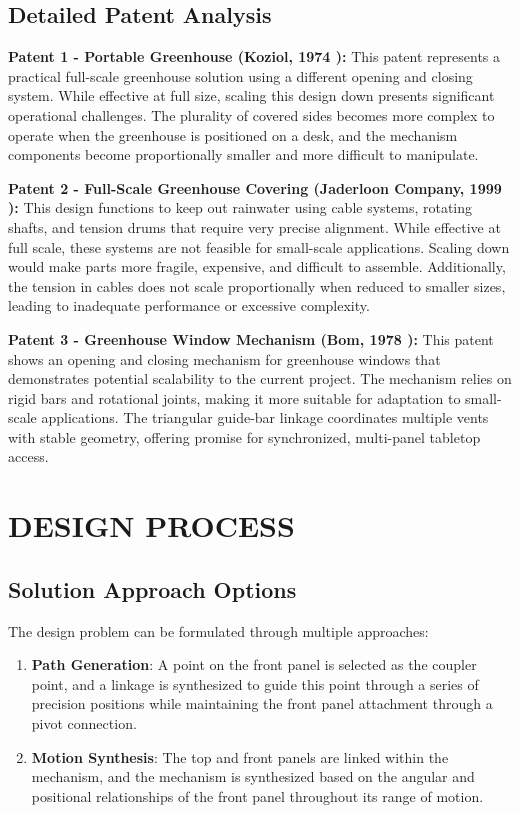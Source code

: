 \documentclass[12pt]{article}
\begin{document}
\subsection*{Detailed Patent Analysis}

\textbf{Patent 1 - Portable Greenhouse (Koziol, 1974 \cite{Koziol1974}):} This patent represents a practical full-scale greenhouse solution using a different opening and closing system. While effective at full size, scaling this design down presents significant operational challenges. The plurality of covered sides becomes more complex to operate when the greenhouse is positioned on a desk, and the mechanism components become proportionally smaller and more difficult to manipulate.

\textbf{Patent 2 - Full-Scale Greenhouse Covering (Jaderloon Company, 1999 \cite{Jaderloon1999}):} This design functions to keep out rainwater using cable systems, rotating shafts, and tension drums that require very precise alignment. While effective at full scale, these systems are not feasible for small-scale applications. Scaling down would make parts more fragile, expensive, and difficult to assemble. Additionally, the tension in cables does not scale proportionally when reduced to smaller sizes, leading to inadequate performance or excessive complexity.

\textbf{Patent 3 - Greenhouse Window Mechanism (Bom, 1978 \cite{Bom1978}):} This patent shows an opening and closing mechanism for greenhouse windows that demonstrates potential scalability to the current project. The mechanism relies on rigid bars and rotational joints, making it more suitable for adaptation to small-scale applications. The triangular guide-bar linkage coordinates multiple vents with stable geometry, offering promise for synchronized, multi-panel tabletop access.

\section*{DESIGN PROCESS}
\subsection*{Solution Approach Options}
The design problem can be formulated through multiple approaches:

\begin{enumerate}
    \item \textbf{Path Generation}: A point on the front panel is selected as the coupler point, and a linkage is synthesized to guide this point through a series of precision positions while maintaining the front panel attachment through a pivot connection.
    
    \item \textbf{Motion Synthesis}: The top and front panels are linked within the mechanism, and the mechanism is synthesized based on the angular and positional relationships of the front panel throughout its range of motion.
\end{enumerate}
\end{document}
